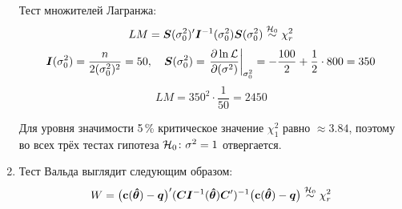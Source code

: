 \begin{problem}
\begin{sol}
\begin{enumerate}
Тест множителей Лагранжа:
\[
LM = \boldsymbol{S}(\sigma^2_0)' \boldsymbol{I}^{-1}(\sigma^2_{0}) \boldsymbol{S}(\sigma^2_{0}) \mathrel{\stackrel{\mathcal{H}_0}{\sim}} \chi^2_r
\]
\[
\boldsymbol{I}(\sigma^2_0) = \frac{n}{2(\sigma^2_0)^2} = 50, \quad \boldsymbol{S}(\sigma^2_0) = \left. \frac{\partial \ln \mathcal{L}}{\partial (\sigma^2)} \right|_{\sigma^2_0} = -\frac{100}{2} + \frac{1}{2} \cdot 800 = 350
\]
\[ LM = 350^2 \cdot \frac{1}{50} = 2450
\]

Для уровня значимости 5\,\% критическое значение $\chi^2_1$ равно $\approx 3.84$, поэтому во всех трёх тестах гипотеза $\mathcal{H}_0\colon \sigma^2=1$ отвергается.

\item Тест Вальда  выглядит следующим образом:
\[
W = \bigl(\mathbf{c}(\boldsymbol{\hat\theta}) - \boldsymbol{q}\bigr)' (\boldsymbol{C} \boldsymbol{I}^{-1}(\boldsymbol{\hat\theta}) \boldsymbol{C}')^{-1} \bigl(\mathbf{c}(\boldsymbol{\hat\theta}) - \boldsymbol{q} \bigr) \mathrel{\stackrel{\mathcal{H}_0}{\sim}} \chi^2_{r}
\]


\end{enumerate}
\end{sol}
\end{problem}
